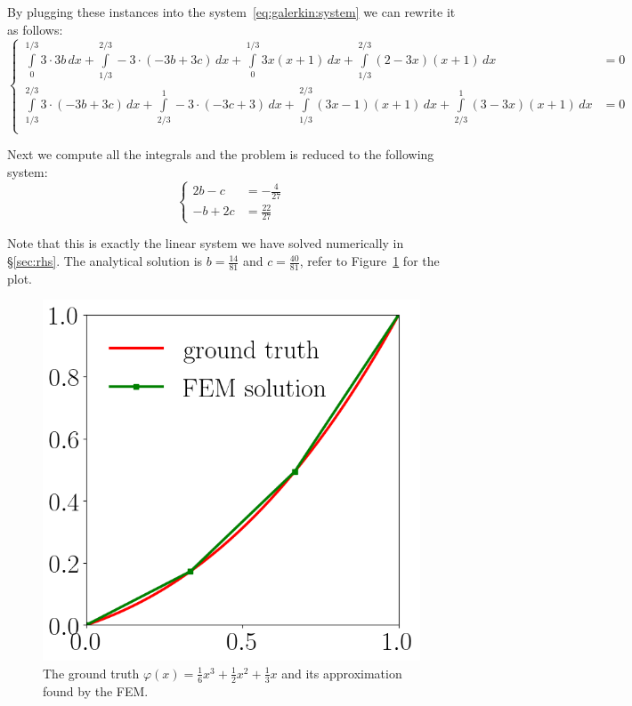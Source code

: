 \documentclass[notitlepage,oneside]{book}
\begin{document}
By plugging these instances into the system~\eqref{eq:galerkin:system} we can rewrite it as follows:
$$
\left\{
\begin{split}
\int\limits_{0}^{1/3} 3\cdot 3b\,dx + \int\limits_{1/3}^{2/3} -3\cdot (-3b+3c)\, dx + \int\limits_{0}^{1/3} 3x(x+1)\,dx + \int\limits_{1/3}^{2/3}(2-3x)(x+1)\,dx &= 0\\
\int\limits_{1/3}^{2/3} 3\cdot (-3b+3c)\,dx + \int\limits_{2/3}^{1} -3\cdot (-3c+3)\, dx + \int\limits_{1/3}^{2/3} (3x-1)(x+1)\,dx + \int\limits_{2/3}^{1}(3-3x)(x+1)\,dx &= 0\\
\end{split}
\right.
$$

Next we compute all the integrals and the problem is reduced to the following system:
\begin{equation}
\label{eq:galerkin:bc}
\left\{
\begin{split}
2b - c &= -\frac{4}{27}\\
-b + 2c &= \frac{22}{27}
\end{split}
\right.
\end{equation}

Note that this is exactly the linear system we have solved numerically in \S\ref{sec:rhs}.
The analytical solution is $b=\frac{14}{81}$ and $c=\frac{40}{81}$, refer to Figure~\ref{fig:fem} for the plot.

\begin{figure}[t]
	\centering
	\includegraphics[width=.3\linewidth]{img/fem.png}
	\caption{The ground truth $\varphi(x) = \frac{1}{6} x^3 + \frac{1}{2} x^2 + \frac{1}{3} x$ and its approximation found by the FEM.}
	\label{fig:fem}
\end{figure}
\end{document}

